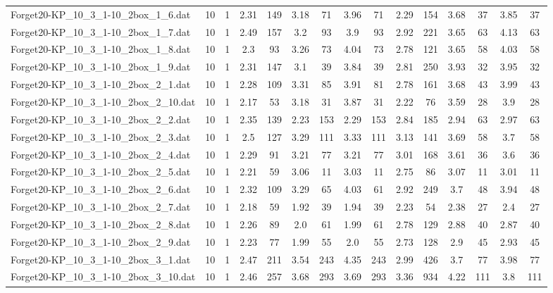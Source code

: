 \begin{table}[!ht]
{\begin{tabular}{lcccccccccccccc}
Forget20-KP\_10\_3\_1-10\_2box\_1\_6.dat & 10 & 1 & 2.31 & 149 & 3.18 & 71 & 3.96 & 71 & 2.29 & 154 & 3.68 & 37 & 3.85 & 37 \\
Forget20-KP\_10\_3\_1-10\_2box\_1\_7.dat & 10 & 1 & 2.49 & 157 & 3.2 & 93 & 3.9 & 93 & 2.92 & 221 & 3.65 & 63 & 4.13 & 63 \\
Forget20-KP\_10\_3\_1-10\_2box\_1\_8.dat & 10 & 1 & 2.3 & 93 & 3.26 & 73 & 4.04 & 73 & 2.78 & 121 & 3.65 & 58 & 4.03 & 58 \\
Forget20-KP\_10\_3\_1-10\_2box\_1\_9.dat & 10 & 1 & 2.31 & 147 & 3.1 & 39 & 3.84 & 39 & 2.81 & 250 & 3.93 & 32 & 3.95 & 32 \\
Forget20-KP\_10\_3\_1-10\_2box\_2\_1.dat & 10 & 1 & 2.28 & 109 & 3.31 & 85 & 3.91 & 81 & 2.78 & 161 & 3.68 & 43 & 3.99 & 43 \\
Forget20-KP\_10\_3\_1-10\_2box\_2\_10.dat & 10 & 1 & 2.17 & 53 & 3.18 & 31 & 3.87 & 31 & 2.22 & 76 & 3.59 & 28 & 3.9 & 28 \\
Forget20-KP\_10\_3\_1-10\_2box\_2\_2.dat & 10 & 1 & 2.35 & 139 & 2.23 & 153 & 2.29 & 153 & 2.84 & 185 & 2.94 & 63 & 2.97 & 63 \\
Forget20-KP\_10\_3\_1-10\_2box\_2\_3.dat & 10 & 1 & 2.5 & 127 & 3.29 & 111 & 3.33 & 111 & 3.13 & 141 & 3.69 & 58 & 3.7 & 58 \\
Forget20-KP\_10\_3\_1-10\_2box\_2\_4.dat & 10 & 1 & 2.29 & 91 & 3.21 & 77 & 3.21 & 77 & 3.01 & 168 & 3.61 & 36 & 3.6 & 36 \\
Forget20-KP\_10\_3\_1-10\_2box\_2\_5.dat & 10 & 1 & 2.21 & 59 & 3.06 & 11 & 3.03 & 11 & 2.75 & 86 & 3.07 & 11 & 3.01 & 11 \\
Forget20-KP\_10\_3\_1-10\_2box\_2\_6.dat & 10 & 1 & 2.32 & 109 & 3.29 & 65 & 4.03 & 61 & 2.92 & 249 & 3.7 & 48 & 3.94 & 48 \\
Forget20-KP\_10\_3\_1-10\_2box\_2\_7.dat & 10 & 1 & 2.18 & 59 & 1.92 & 39 & 1.94 & 39 & 2.23 & 54 & 2.38 & 27 & 2.4 & 27 \\
Forget20-KP\_10\_3\_1-10\_2box\_2\_8.dat & 10 & 1 & 2.26 & 89 & 2.0 & 61 & 1.99 & 61 & 2.78 & 129 & 2.88 & 40 & 2.87 & 40 \\
Forget20-KP\_10\_3\_1-10\_2box\_2\_9.dat & 10 & 1 & 2.23 & 77 & 1.99 & 55 & 2.0 & 55 & 2.73 & 128 & 2.9 & 45 & 2.93 & 45 \\
Forget20-KP\_10\_3\_1-10\_2box\_3\_1.dat & 10 & 1 & 2.47 & 211 & 3.54 & 243 & 4.35 & 243 & 2.99 & 426 & 3.7 & 77 & 3.98 & 77 \\
Forget20-KP\_10\_3\_1-10\_2box\_3\_10.dat & 10 & 1 & 2.46 & 257 & 3.68 & 293 & 3.69 & 293 & 3.36 & 934 & 4.22 & 111 & 3.8 & 111 \\

\end{tabular}}
\end{table}
